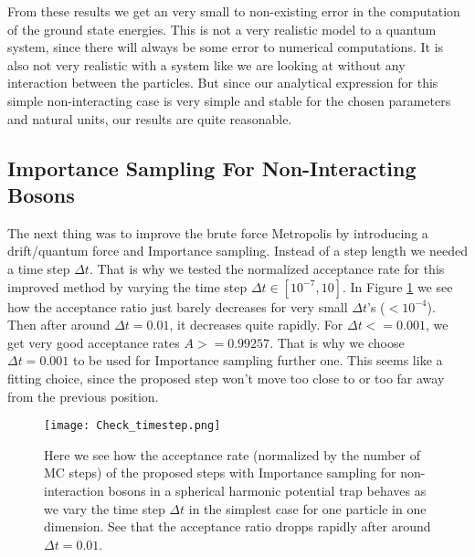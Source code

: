 \documentclass[12pt,a4paper,english]{article}
\begin{document}
From these results we get an very small to non-existing error in the computation of the ground state energies. This is not a very realistic model to a quantum system, since there will always be some error to numerical computations. It is also not very realistic with a system like we are looking at without any interaction between the particles. But since our analytical expression for this simple non-interacting case is very simple and stable for the chosen parameters and natural units, our results are quite reasonable.

\subsection{Importance Sampling For Non-Interacting Bosons}
\label{subsect:Result_importance_non-int}
The next thing was to improve the brute force Metropolis by introducing a drift/quantum force and Importance sampling. Instead of a step length we needed a time step $\Delta t$. That is why we tested the normalized acceptance rate for this improved method by varying the time step $\Delta t\in[10^{-7},10]$. In Figure \ref{fig:check_timestep} we see how the acceptance ratio just barely decreases for very small $\Delta t$'s ($<10^{-4}$). Then after around $\Delta t=0.01$, it decreases quite rapidly. For $\Delta t<=0.001$, we get very good acceptance rates $A>=0.99257$. That is why we choose $\Delta t=0.001$ to be used for Importance sampling further one. This seems like a fitting choice, since the proposed step won't move too close to or too far away from the previous position.

\begin{figure}[htbp!]
	\centering\texttt{[image: Check\_timestep.png]}
	\caption{Here we see how the acceptance rate (normalized by the number of MC steps) of the proposed steps with Importance sampling for non-interaction bosons in a spherical harmonic potential trap behaves as we vary the time step $\Delta t$ in the simplest case for one particle in one dimension. See that the acceptance ratio dropps rapidly after around $\Delta t=0.01$. \label{fig:check_timestep}}
\end{figure} 
\end{document}
